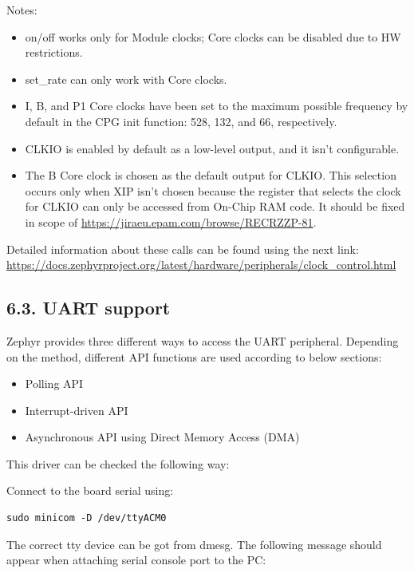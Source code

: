 \documentclass[11pt,a4paper,oneside]{article}
\begin{document}
Notes:
\begin{itemize}
  \item
    on/off works only for Module clocks; Core clocks can be disabled due to HW restrictions.
  \item
    set\_rate can only work with Core clocks.
  \item
    I, B, and P1 Core clocks have been set to the maximum possible frequency by default in the
    CPG init function: 528, 132, and 66, respectively.
  \item
    CLKIO is enabled by default as a low-level output, and it isn't configurable.
  \item
    The B Core clock is chosen as the default output for CLKIO. This selection occurs only when
    XIP isn't chosen because the register that selects the clock for CLKIO can only be accessed from
    On-Chip RAM code. It should be fixed in scope of \url{https://jiraeu.epam.com/browse/RECRZZP-81}.
\end{itemize}

Detailed information about these calls can be found using the next link:
\url{https://docs.zephyrproject.org/latest/hardware/peripherals/clock_control.html}

\subsection*{6.3. UART support}\label{uart-support}

Zephyr provides three different ways to access the UART peripheral.
Depending on the method, different API functions are used according to
below sections:

\begin{itemize}
\item
  Polling API
\item
  Interrupt-driven API
\item
  Asynchronous API using Direct Memory Access (DMA)
\end{itemize}

This driver can be checked the following way:

Connect to the board serial using:

\begin{lstlisting}
sudo minicom -D /dev/ttyACM0
\end{lstlisting}

The correct tty device can be got from dmesg. The following message
should appear when attaching serial console port to the PC:
\end{document}
